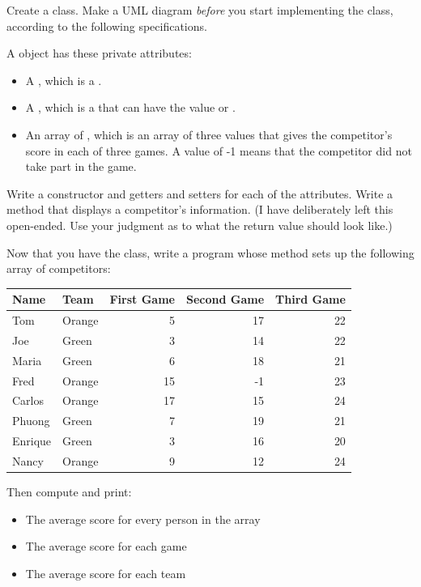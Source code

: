 \begin{exercise}
Create a  class. Make a UML diagram {\em before} you start implementing the class, according to the following specifications.

A  object has these private attributes:

\begin{itemize}
\item A , which is a .
\item A , which is a  that can have the value  or .
\item An array of , which is an array of three  values that gives the competitor's score in each of three games. A value of -1 means that the competitor did not take part in the game.
\end{itemize}

Write a constructor and getters and setters for each of the attributes. Write a  method that displays a competitor's information. (I have deliberately left this open-ended. Use your judgment as to what the return value should look like.)

Now that you have the  class, write a program whose  method sets up the following array of competitors:

\begin{tabular}{|l|l|r|r|r|}
\hline
Name & Team & First Game & Second Game & Third Game \\ \hline
Tom & Orange & 5 & 17 & 22 \\ \hline
Joe & Green & 3 & 14 & 22 \\ \hline
Maria & Green & 6 & 18 & 21 \\ \hline
Fred & Orange & 15 & -1 & 23 \\ \hline
Carlos & Orange & 17 & 15 & 24 \\ \hline
Phuong & Green & 7 & 19 & 21 \\ \hline
Enrique & Green & 3 & 16 & 20 \\ \hline
Nancy & Orange & 9 & 12 & 24 \\ \hline
\end{tabular}

Then compute and print:

\begin{itemize}
\item The average score for every person in the array
\item The average score for each game
\item The average score for each team
\end{itemize}

\end{exercise}
